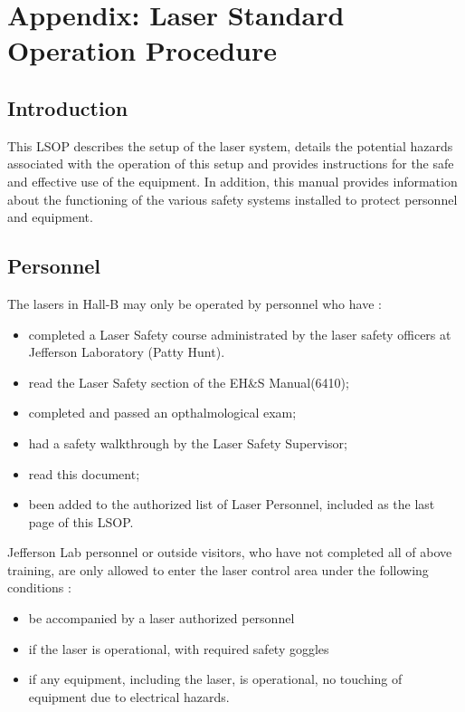 \section{Appendix: Laser Standard Operation Procedure}
\label{sec:lsop}

\subsection{ Introduction}

This LSOP describes the setup of the 
laser system, details the potential
hazards associated with the operation of this setup and provides instructions
for the safe and effective use of the equipment. In addition,
this manual provides information about the functioning of the various safety 
systems installed to protect personnel and equipment.

\subsection{Personnel}

The  lasers in Hall-B  may only be operated by
personnel who have :
\begin {itemize}
\item completed a Laser Safety course administrated by the laser safety officers at
Jefferson Laboratory (Patty Hunt).
\item read the Laser Safety section of the EH\&S Manual(6410);
\item  completed and passed an opthalmological exam;
\item had a safety walkthrough by the Laser Safety Supervisor;
\item read this document;
\item been added to the authorized list of Laser Personnel, included as the 
last page of this LSOP.
\end {itemize}
Jefferson Lab personnel or outside visitors, who have not completed all of 
above training, are
only allowed to enter the laser control area under the following conditions :
\begin {itemize}
\item be accompanied by a laser authorized personnel
\item if the laser is operational, with required safety
goggles
\item if any equipment, including the laser, is operational, no touching of
equipment due to electrical hazards.
\end {itemize}


